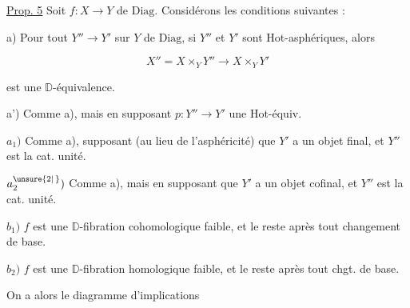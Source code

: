 

\uline{Prop. 5} Soit $f:X\to Y$ de $\mathrm{Diag}$. Considérons les conditions suivantes :

a) Pour tout $Y''\to Y'$ sur $Y$ de $\mathrm{Diag}$, si $Y''$ et $Y'$ sont Hot-asphériques, alors

\[
X''=X\times_Y Y''\longrightarrow X\times_Y Y'
\]

est une $\mathbb D$-équivalence.


a') Comme a), mais en supposant $p:Y''\to Y'$ une Hot-équiv. 


$a_1)$ Comme a),   supposant (au lieu de l'asphéricité) que $Y'$ a un objet final, et $Y''$ est la cat. unité.

$a^{\unsure{2|\,}}_2)$ Comme a),  mais en supposant que $Y'$ a un objet cofinal, et $Y''$ est la cat. unité.

$b_1)$ $f$ est une $\mathbb D$-fibration cohomologique faible, et le reste après tout changement de base.

$b_2)$ $f$ est une $\mathbb D$-fibration homologique faible, et le reste après tout chgt. de base.

On a alors le diagramme d'implications 



